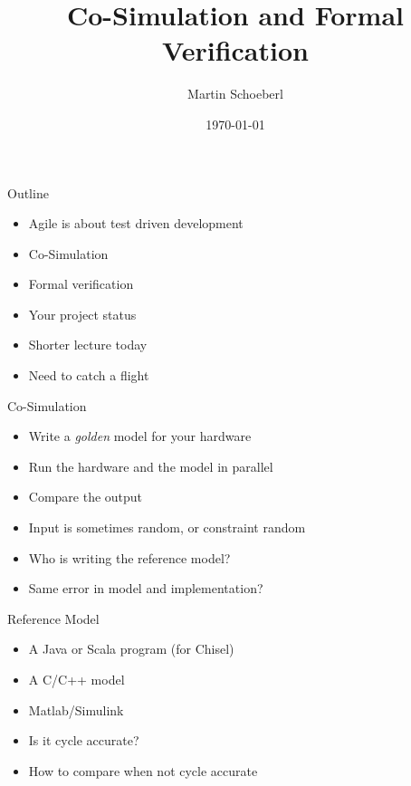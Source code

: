 

\newif\ifbook


\usepackage{tikz}
\usetikzlibrary{positioning, arrows.meta}


\title{Co-Simulation and Formal Verification}
\author{Martin Schoeberl}
\date{\today}



\begin{frame}
\titlepage
\end{frame}




\begin{frame}[fragile]{Outline}
\begin{itemize}
\item Agile is about test driven development
\item Co-Simulation
\item Formal verification
\item Your project status
\item Shorter lecture today
\item Need to catch a flight
\end{itemize}
\end{frame}

\begin{frame}[fragile]{Co-Simulation}
\begin{itemize}
\item Write a \emph{golden} model for your hardware
\item Run the hardware and the model in parallel
\item Compare the output
\item Input is sometimes random, or constraint random
\item Who is writing the reference model?
\item Same error in model and implementation?
\end{itemize}
\end{frame}

\begin{frame}[fragile]{Reference Model}
\begin{itemize}
\item A Java or Scala program (for Chisel)
\item A C/C++ model
\item Matlab/Simulink
\item Is it cycle accurate?
\item How to compare when not cycle accurate
\end{itemize}
\end{frame}

